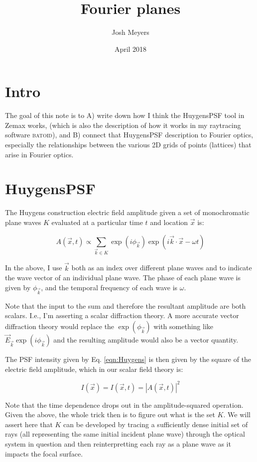 \documentclass{article}
\title{Fourier planes}
\author{Josh Meyers}
\date{April 2018}
\begin{document}
\section{Intro}

The goal of this note is to A) write down how I think the HuygensPSF tool in Zemax works, (which is
also the description of how it works in my raytracing software \textsc{batoid}), and B) connect that
HuygensPSF description to Fourier optics, especially the relationships between the various 2D grids
of points (lattices) that arise in Fourier optics.

\section{HuygensPSF}

The Huygens construction electric field amplitude given a set of monochromatic plane waves $K$
evaluated at a particular time $t$ and location $\vec{x}$ is:

\begin{equation}
    A(\vec{x}, t) \propto \sum_{\vec{k} \in K} \exp\left(i \phi_{\vec{k}}\right) \exp\left( i \vec{k} \cdot \vec{x} - \omega t\right)
    \label{eqn:Huygens}
\end{equation}

In the above, I use $\vec{k}$ both as an index over different plane waves and to indicate the
wave vector of an individual plane wave.  The phase of each plane wave is given by $\phi_{\vec{k}}$,
and the temporal frequency of each wave is $\omega$.

Note that the input to the sum and therefore the resultant amplitude are both scalars.  I.e., I'm
asserting a scalar diffraction theory.  A more accurate vector diffraction theory would replace the
$\exp\left(\phi_{\vec{k}}\right)$ with something like $\vec{E}_{\vec{k}} \exp\left(i
\phi_{\vec{k}}\right)$ and the resulting amplitude would also be a vector quantity.

The PSF intensity given by Eq. \ref{eqn:Huygens} is then given by the square of the electric field
amplitude, which in our scalar field theory is:

\begin{equation}
    I(\vec{x}) = I(\vec{x}, t) = |A(\vec{x}, t)|^2
\end{equation}

Note that the time dependence drops out in the amplitude-squared operation.  Given the above, the
whole trick then is to figure out what is the set $K$.  We will assert here that $K$ can be
developed by tracing a sufficiently dense initial set of rays (all representing the same initial
incident plane wave) through the optical system in question and then reinterpretting each ray
as a plane wave as it impacts the focal surface.
\end{document}
